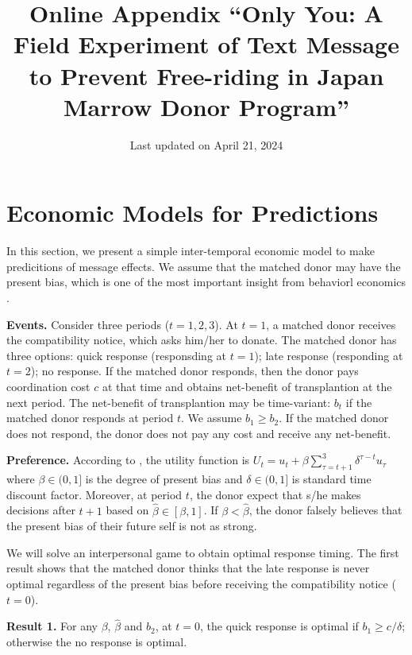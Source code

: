 \documentclass[
]{article}
\title{Online Appendix
``Only You: A Field Experiment of Text Message to Prevent Free-riding in Japan Marrow Donor Program''}
\author{}
\date{\vspace{-2.5em}Last updated on April 21, 2024}
\begin{document}
\maketitle

{
\setcounter{tocdepth}{2}
\tableofcontents
}
\hypertarget{economic-models-for-predictions}{%
\section{Economic Models for Predictions}\label{economic-models-for-predictions}}

In this section, we present a simple inter-temporal economic model to make predicitions of message effects. We assume that the matched donor may have the present bias, which is one of the most important insight from behaviorl economics \citep{Laibson1997, ODonoghue2001}.

\noindent
\textbf{Events.} Consider three periods (\(t = 1, 2, 3\)). At \(t=1\), a matched donor receives the compatibility notice, which asks him/her to donate. The matched donor has three options: quick response (responsding at \(t=1\)); late response (responding at \(t=2\)); no response. If the matched donor responds, then the donor pays coordination cost \(c\) at that time and obtains net-benefit of transplantion at the next period. The net-benefit of transplantion may be time-variant: \(b_t\) if the matched donor responds at period \(t\). We assume \(b_1 \ge b_2\). If the matched donor does not respond, the donor does not pay any cost and receive any net-benefit.

\noindent
\textbf{Preference.} According to \citet{Laibson1997}, the utility function is \(U_t = u_t + \beta \sum_{\tau = t + 1}^{3} \delta^{\tau - t} u_{\tau}\) where \(\beta \in (0, 1]\) is the degree of present bias and \(\delta \in (0, 1]\) is standard time discount factor. Moreover, at period \(t\), the donor expect that s/he makes decisions after \(t + 1\) based on \(\hat{\beta} \in [\beta, 1]\). If \(\beta < \hat{\beta}\), the donor falsely believes that the present bias of their future self is not as strong.

We will solve an interpersonal game \citep{ODonoghue2001} to obtain optimal response timing. The first result shows that the matched donor thinks that the late response is never optimal regardless of the present bias before receiving the compatibility notice (\(t=0\)).

\noindent
\textbf{Result 1.} For any \(\beta\), \(\hat{\beta}\) and \(b_2\), at \(t = 0\), the quick response is optimal if \(b_1 \ge c/\delta\); otherwise the no response is optimal.
\end{document}
